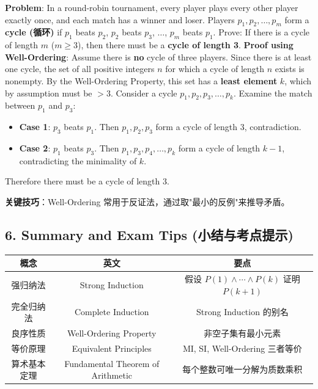\documentclass[10pt,a4paper,openany]{ctexbook}
\theoremstyle{definition}
\theoremstyle{remark}
\renewenvironment{quote}
  {\list{}{\leftmargin=1em\rightmargin=0pt\topsep=0.5pt\partopsep=0pt}\item[]}
  {\endlist}
\begin{document}
\textbf{Problem}: In a round-robin tournament, every player plays every other player exactly once, and each match has a winner and loser. Players $p_1, p_2, \dots, p_m$ form a \textbf{cycle (循环)} if $p_1$ beats $p_2$, $p_2$ beats $p_3$, $\dots$, $p_m$ beats $p_1$.
Prove: If there is a cycle of length $m$ ($m \ge 3$), then there must be a \textbf{cycle of length 3}.
\textbf{Proof using Well-Ordering}:
Assume there is \textbf{no} cycle of three players. Since there is at least one cycle, the set of all positive integers $n$ for which a cycle of length $n$ exists is nonempty.
By the Well-Ordering Property, this set has a \textbf{least element} $k$, which by assumption must be $> 3$.
Consider a cycle $p_1, p_2, p_3, \dots, p_k$. Examine the match between $p_1$ and $p_3$:
\begin{itemize}
\item \textbf{Case 1}: $p_3$ beats $p_1$. Then $p_1, p_2, p_3$ form a cycle of length 3, contradiction.
\item \textbf{Case 2}: $p_1$ beats $p_3$. Then $p_1, p_3, p_4, \dots, p_k$ form a cycle of length $k-1$, contradicting the minimality of $k$.

\end{itemize}

Therefore there must be a cycle of length 3.
\begin{quote}
\textbf{关键技巧}：Well-Ordering 常用于反证法，通过取"最小的反例"来推导矛盾。

\end{quote}
\vspace{-2pt}

\subsection{6. Summary and Exam Tips (小结与考点提示)}

\begin{center}
\begin{tabular}{ccc}
\hline
概念 & 英文 & 要点 \\ \hline
强归纳法 & Strong Induction & 假设 $P(1) \land \cdots \land P(k)$ 证明 $P(k+1)$ \\
完全归纳法 & Complete Induction & Strong Induction 的别名 \\
良序性质 & Well-Ordering Property & 非空子集有最小元素 \\
等价原理 & Equivalent Principles & MI, SI, Well-Ordering 三者等价 \\
算术基本定理 & Fundamental Theorem of Arithmetic & 每个整数可唯一分解为质数乘积 \\
\hline
\end{tabular}

\end{center}
\end{document}
